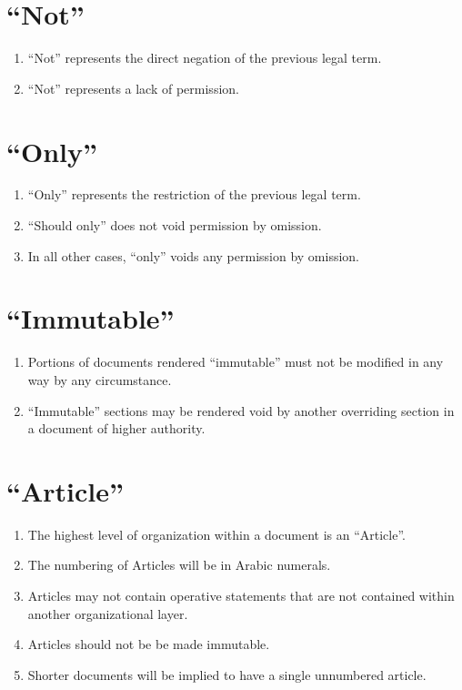 \documentclass[12pt, letterpaper]{report}
\begin{document}
\begin{linenumbers}
    	\section{``Not''}
    	    \begin{enumerate}
            \renewcommand{\labelenumi}{\bfseries\alph{enumi})}
    	        \item ``Not'' represents the direct negation of the previous legal term.
    	        \item ``Not'' represents a lack of permission.
            \end{enumerate}
    	\section{``Only''}
        	\begin{enumerate}
            \renewcommand{\labelenumi}{\bfseries\alph{enumi})}
    	        \item ``Only'' represents the restriction of the previous legal term.
    	        \item ``Should only'' does not void permission by omission.
    	        \item In all other cases, ``only'' voids any permission by omission.
            \end{enumerate}
    	\section{``Immutable''}
	    	\begin{enumerate}
            \renewcommand{\labelenumi}{\bfseries\alph{enumi})}
        	    \item Portions of documents rendered ``immutable'' must not be modified in any way by any circumstance.
        	    \item ``Immutable'' sections may be rendered void by another overriding section in a document of higher authority.
            \end{enumerate}
    	\section{``Article''}
        	\begin{enumerate}
                \renewcommand{\labelenumi}{\bfseries\alph{enumi})}
            	    \item The highest level of organization within a document is an ``Article''.
            	    \item The numbering of Articles will be in Arabic numerals.
            	    \item Articles may not contain operative statements that are not contained within another organizational layer.
            	    \item Articles should not be be made immutable.
            	    \item Shorter documents will be implied to have a single unnumbered article.
            \end{enumerate}

\end{linenumbers}
\end{document}
